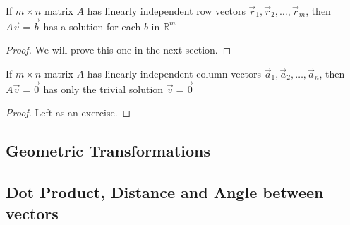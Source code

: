 \begin{proposition}
If $m \times n$ matrix $A$ has linearly independent row vectors $\vec{r}_1, \vec{r}_2, \ldots, \vec{r}_m$, then $A\vec{v}=\vec{b}$ has a solution for each $b$ in 
$\mathbb{R}^m$
\end{proposition}
\begin{proof}
We will prove this one in the next section.
\end{proof}

\begin{proposition}
If $m \times n$ matrix $A$ has linearly independent column vectors $\vec{a}_1, \vec{a}_2, \ldots, \vec{a}_n$, then $A\vec{v}=\vec{0}$ has only the trivial solution 
$\vec{v}=\vec{0}$
\end{proposition}
\begin{proof}
Left as an exercise.
\end{proof}


\subsection{Geometric Transformations}

\subsection{Dot Product, Distance and Angle between vectors}

